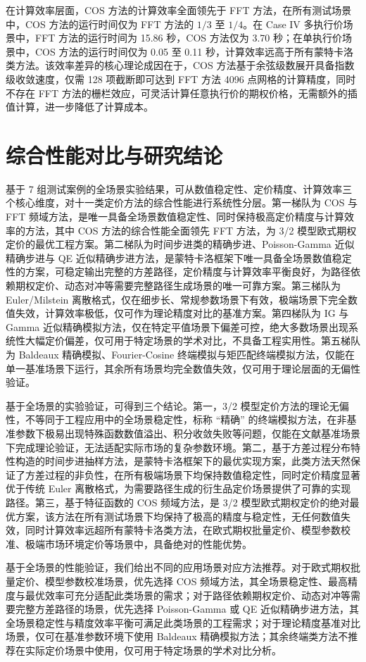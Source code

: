 在计算效率层面，COS 方法的计算效率全面领先于 FFT 方法，在所有测试场景中，COS 方法的运行时间仅为 FFT 方法的 $1/3$ 至 $1/4$。在 Case IV 多执行价场景中，FFT 方法的运行时间为 15.86 秒，COS 方法仅为 3.70 秒；在单执行价场景中，COS 方法的运行时间仅为 0.05 至 0.11 秒，计算效率远高于所有蒙特卡洛类方法。该效率差异的核心理论成因在于，COS 方法基于余弦级数展开具备指数级收敛速度，仅需 128 项截断即可达到 FFT 方法 4096 点网格的计算精度，同时不存在 FFT 方法的栅栏效应，可灵活计算任意执行价的期权价格，无需额外的插值计算，进一步降低了计算成本。

\section{综合性能对比与研究结论}

基于 7 组测试案例的全场景实验结果，可从数值稳定性、定价精度、计算效率三个核心维度，对十一类定价方法的综合性能进行系统性分层。第一梯队为 COS 与 FFT 频域方法，是唯一具备全场景数值稳定性、同时保持极高定价精度与计算效率的方法，其中 COS 方法的综合性能全面领先 FFT 方法，为 3/2 模型欧式期权定价的最优工程方案。第二梯队为时间步进类的精确步进、Poisson-Gamma 近似精确步进与 QE 近似精确步进方法，是蒙特卡洛框架下唯一具备全场景数值稳定性的方案，可稳定输出完整的方差路径，定价精度与计算效率平衡良好，为路径依赖期权定价、动态对冲等需要完整路径生成场景的唯一可靠方案。第三梯队为 Euler/Milstein 离散格式，仅在细步长、常规参数场景下有效，极端场景下完全数值失效，计算效率极低，仅可作为理论精度对比的基准方案。第四梯队为 IG 与 Gamma 近似精确模拟方法，仅在特定平值场景下偏差可控，绝大多数场景出现系统性大幅定价偏差，仅可用于特定场景的学术对比，不具备工程实用性。第五梯队为 Baldeaux 精确模拟、Fourier-Cosine 终端模拟与矩匹配终端模拟方法，仅能在单一基准场景下运行，其余所有场景均完全数值失效，仅可用于理论层面的无偏性验证。

基于全场景的实验验证，可得到三个结论。第一，3/2 模型定价方法的理论无偏性，不等同于工程应用中的全场景稳定性，标称 “精确” 的终端模拟方法，在非基准参数下极易出现特殊函数数值溢出、积分收敛失败等问题，仅能在文献基准场景下完成理论验证，无法适配实际市场的复杂参数环境。第二，基于方差过程分布特性构造的时间步进抽样方法，是蒙特卡洛框架下的最优实现方案，此类方法天然保证了方差过程的非负性，在所有极端场景下均保持数值稳定性，同时定价精度显著优于传统 Euler 离散格式，为需要路径生成的衍生品定价场景提供了可靠的实现路径。第三，基于特征函数的 COS 频域方法，是 3/2 模型欧式期权定价的绝对最优方案，该方法在所有测试场景下均保持了极高的精度与稳定性，无任何数值失效，同时计算效率远超所有蒙特卡洛类方法，在欧式期权批量定价、模型参数校准、极端市场环境定价等场景中，具备绝对的性能优势。

基于全场景的性能验证，我们给出不同的应用场景对应方法推荐。对于欧式期权批量定价、模型参数校准场景，优先选择 COS 频域方法，其全场景稳定性、最高精度与最优效率可充分适配此类场景的需求；对于路径依赖期权定价、动态对冲等需要完整方差路径的场景，优先选择 Poisson-Gamma 或 QE 近似精确步进方法，其全场景稳定性与精度效率平衡可满足此类场景的工程需求；对于理论精度基准对比场景，仅可在基准参数环境下使用 Baldeaux 精确模拟方法；其余终端类方法不推荐在实际定价场景中使用，仅可用于特定场景的学术对比分析。